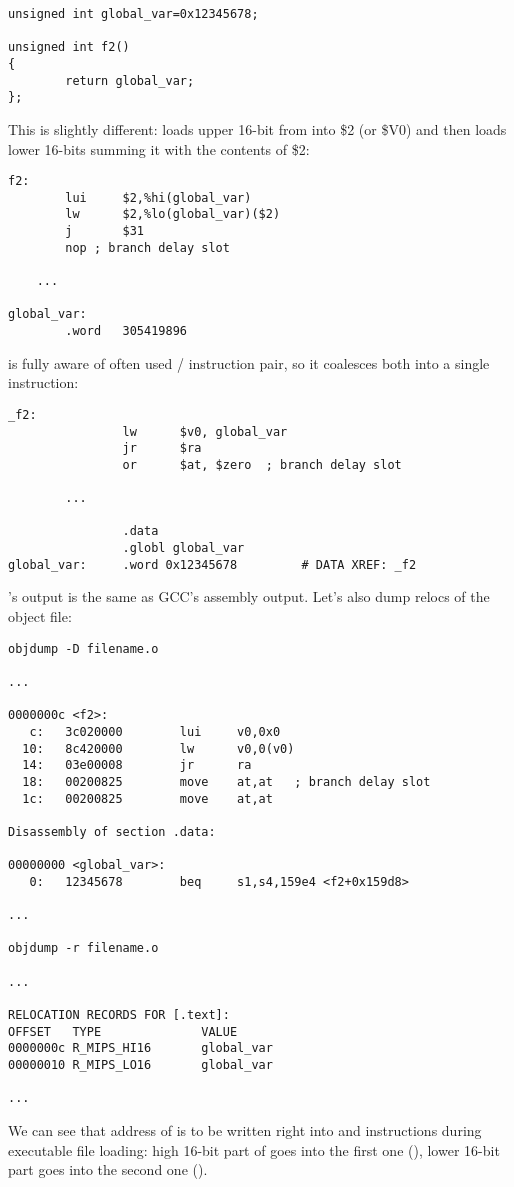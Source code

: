 \begin{lstlisting}
unsigned int global_var=0x12345678;

unsigned int f2()
{
        return global_var;
};
\end{lstlisting}


This is slightly different:  loads upper 16-bit from  into \$2 (or \$V0) and then  loads lower 16-bits summing it with the contents of \$2:

\begin{lstlisting}[caption=GCC 4.4.5 -O3 (\assemblyOutput)]
f2:
        lui     $2,%hi(global_var)
        lw      $2,%lo(global_var)($2)
        j       $31
        nop	; branch delay slot

	...

global_var:
        .word   305419896
\end{lstlisting}

\IDA is fully aware of often used / instruction pair, so it coalesces both into a single  instruction:

\begin{lstlisting}[caption=GCC 4.4.5 -O3 (IDA)]
_f2:
                lw      $v0, global_var
                jr      $ra
                or      $at, $zero	; branch delay slot

		...

                .data
                .globl global_var
global_var:     .word 0x12345678         # DATA XREF: _f2
\end{lstlisting}

's output is the same as GCC's assembly output.
Let's also dump relocs of the object file:

\begin{lstlisting}[caption=objdump]
objdump -D filename.o

...

0000000c <f2>:
   c:   3c020000        lui     v0,0x0
  10:   8c420000        lw      v0,0(v0)
  14:   03e00008        jr      ra
  18:   00200825        move    at,at	; branch delay slot
  1c:   00200825        move    at,at

Disassembly of section .data:

00000000 <global_var>:
   0:   12345678        beq     s1,s4,159e4 <f2+0x159d8>

...

objdump -r filename.o

...

RELOCATION RECORDS FOR [.text]:
OFFSET   TYPE              VALUE
0000000c R_MIPS_HI16       global_var
00000010 R_MIPS_LO16       global_var

...

\end{lstlisting}

We can see that address of  is to be written right into  and  instructions during executable file loading:
high 16-bit part of  goes into the first one (), lower 16-bit part goes into the second one ().

